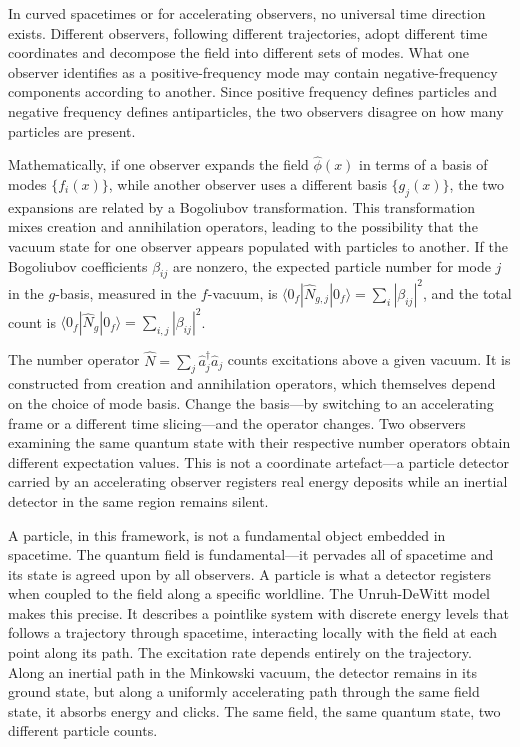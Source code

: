 In curved spacetimes or for accelerating observers, no universal time direction exists. Different observers, following different trajectories, adopt different time coordinates and decompose the field into different sets of modes. What one observer identifies as a positive-frequency mode may contain negative-frequency components according to another. Since positive frequency defines particles and negative frequency defines antiparticles, the two observers disagree on how many particles are present.

Mathematically, if one observer expands the field $\hat{\phi}(x)$ in terms of a basis of modes $\{f_i(x)\}$, while another observer uses a different basis $\{g_j(x)\}$, the two expansions are related by a Bogoliubov transformation. This transformation mixes creation and annihilation operators, leading to the possibility that the vacuum state for one observer appears populated with particles to another. If the Bogoliubov coefficients $\beta_{ij}$ are nonzero, the expected particle number for mode $j$ in the $g$-basis, measured in the $f$-vacuum, is $\langle 0_f | \hat{N}_{g,j} | 0_f \rangle = \sum_i |\beta_{ij}|^2$, and the total count is $\langle 0_f | \hat{N}_g | 0_f \rangle = \sum_{i,j} |\beta_{ij}|^2$.

The number operator $\hat{N} = \sum_j \hat{a}_j^\dagger \hat{a}_j$ counts excitations above a given vacuum. It is constructed from creation and annihilation operators, which themselves depend on the choice of mode basis. Change the basis—by switching to an accelerating frame or a different time slicing—and the operator changes. Two observers examining the same quantum state with their respective number operators obtain different expectation values. This is not a coordinate artefact—a particle detector carried by an accelerating observer registers real energy deposits while an inertial detector in the same region remains silent.

A particle, in this framework, is not a fundamental object embedded in spacetime. The quantum field is fundamental—it pervades all of spacetime and its state is agreed upon by all observers. A particle is what a detector registers when coupled to the field along a specific worldline. The Unruh-DeWitt model makes this precise. It describes a pointlike system with discrete energy levels that follows a trajectory through spacetime, interacting locally with the field at each point along its path. The excitation rate depends entirely on the trajectory. Along an inertial path in the Minkowski vacuum, the detector remains in its ground state, but along a uniformly accelerating path through the same field state, it absorbs energy and clicks. The same field, the same quantum state, two different particle counts.

